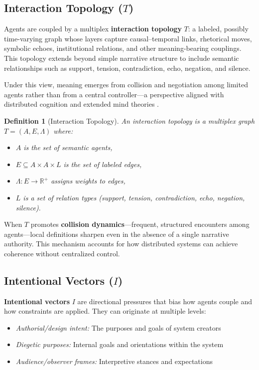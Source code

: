 \documentclass[12pt]{article}
\newtheorem{definition}{Definition}
\begin{document}
\subsection{Interaction Topology ($T$)}

Agents are coupled by a multiplex \textbf{interaction topology} $T$: a labeled, possibly time-varying graph whose layers capture causal–temporal links, rhetorical moves, symbolic echoes, institutional relations, and other meaning-bearing couplings. This topology extends beyond simple narrative structure to include semantic relationships such as support, tension, contradiction, echo, negation, and silence.

Under this view, meaning emerges from collision and negotiation among limited agents rather than from a central controller—a perspective aligned with distributed cognition \citep{hutchins1995cognition} and extended mind theories \citep{clark1998extended}.

\begin{definition}[Interaction Topology]
An interaction topology is a multiplex graph $T = (A, E, \Lambda)$ where:
\begin{itemize}
\item $A$ is the set of semantic agents,
\item $E \subseteq A \times A \times L$ is the set of labeled edges,
\item $\Lambda: E \rightarrow \mathbb{R}^+$ assigns weights to edges,
\item $L$ is a set of relation types (support, tension, contradiction, echo, negation, silence).
\end{itemize}
\end{definition}

When $T$ promotes \textbf{collision dynamics}—frequent, structured encounters among agents—local definitions sharpen even in the absence of a single narrative authority. This mechanism accounts for how distributed systems can achieve coherence without centralized control.

\subsection{Intentional Vectors ($I$)}

\textbf{Intentional vectors} $I$ are directional pressures that bias how agents couple and how constraints are applied. They can originate at multiple levels:
\begin{itemize}
\item \textit{Authorial/design intent:} The purposes and goals of system creators
\item \textit{Diegetic purposes:} Internal goals and orientations within the system
\item \textit{Audience/observer frames:} Interpretive stances and expectations
\end{itemize}
\end{document}
